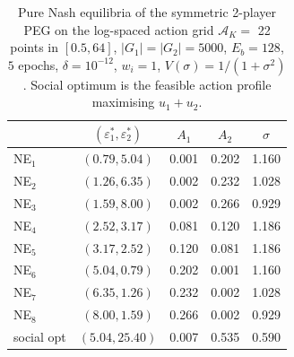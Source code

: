 \begin{table}[t]
\centering
\caption{Pure Nash equilibria of the symmetric 2-player PEG on the log-spaced action grid $\mathcal{A}_K = $ 22 points in $[0.5, 64]$, $|G_1|=|G_2|=5000$, $E_b=128$, $5$ epochs, $\delta=10^{-12}$, $w_i = 1$, $V(\sigma) = 1/(1+\sigma^2)$. Social optimum is the feasible action profile maximising $u_1+u_2$.}
\label{tab:NE}
\begin{tabular}{lcccc}
\toprule
 & $(\varepsilon_1^*, \varepsilon_2^*)$ & $A_1$ & $A_2$ & $\sigma$ \\
\midrule
NE$_{1}$ & $(0.79, 5.04)$ & 0.001 & 0.202 & 1.160 \\
NE$_{2}$ & $(1.26, 6.35)$ & 0.002 & 0.232 & 1.028 \\
NE$_{3}$ & $(1.59, 8.00)$ & 0.002 & 0.266 & 0.929 \\
NE$_{4}$ & $(2.52, 3.17)$ & 0.081 & 0.120 & 1.186 \\
NE$_{5}$ & $(3.17, 2.52)$ & 0.120 & 0.081 & 1.186 \\
NE$_{6}$ & $(5.04, 0.79)$ & 0.202 & 0.001 & 1.160 \\
NE$_{7}$ & $(6.35, 1.26)$ & 0.232 & 0.002 & 1.028 \\
NE$_{8}$ & $(8.00, 1.59)$ & 0.266 & 0.002 & 0.929 \\
social opt & $(5.04, 25.40)$ & 0.007 & 0.535 & 0.590 \\
\bottomrule
\end{tabular}
\end{table}